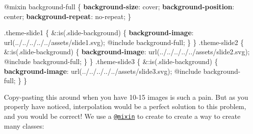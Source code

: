 \documentclass[
  letterpaper,
  DIV=11,
  numbers=noendperiod]{scrreprt}
\newenvironment{Shaded}{\begin{snugshade}}{\end{snugshade}}
\newcommand{\DecValTok}[1]{\textcolor[rgb]{0.68,0.00,0.00}{#1}}
\newcommand{\FunctionTok}[1]{\textcolor[rgb]{0.28,0.35,0.67}{#1}}
\newcommand{\ImportTok}[1]{\textcolor[rgb]{0.00,0.46,0.62}{#1}}
\newcommand{\InformationTok}[1]{\textcolor[rgb]{0.37,0.37,0.37}{#1}}
\newcommand{\KeywordTok}[1]{\textcolor[rgb]{0.00,0.23,0.31}{\textbf{#1}}}
\newcommand{\NormalTok}[1]{\textcolor[rgb]{0.00,0.23,0.31}{#1}}
\newcommand{\OperatorTok}[1]{\textcolor[rgb]{0.37,0.37,0.37}{#1}}
\newcommand{\StringTok}[1]{\textcolor[rgb]{0.13,0.47,0.30}{#1}}
\begin{document}
\begin{Shaded}
\begin{Highlighting}[]
\ImportTok{@mixin} \FunctionTok{background{-}full}\NormalTok{ \{}
  \KeywordTok{background{-}size}\NormalTok{: }\DecValTok{cover}\OperatorTok{;}
  \KeywordTok{background{-}position}\NormalTok{: }\DecValTok{center}\OperatorTok{;}
  \KeywordTok{background{-}repeat}\NormalTok{: }\DecValTok{no{-}repeat}\OperatorTok{;}
\NormalTok{\}}

\FunctionTok{.theme{-}slide1}\NormalTok{ \{}
  \OperatorTok{\&}\InformationTok{:is(.slide{-}background)}\NormalTok{ \{}
    \KeywordTok{background{-}image}\NormalTok{: }\FunctionTok{url(}\StringTok{\textquotesingle{}../../../../../assets/slide1.svg\textquotesingle{}}\FunctionTok{)}\OperatorTok{;}
    \ImportTok{@include}\NormalTok{ background{-}full}\OperatorTok{;}
\NormalTok{  \}}
\NormalTok{\}}
\FunctionTok{.theme{-}slide2}\NormalTok{ \{}
  \OperatorTok{\&}\InformationTok{:is(.slide{-}background)}\NormalTok{ \{}
    \KeywordTok{background{-}image}\NormalTok{: }\FunctionTok{url(}\StringTok{\textquotesingle{}../../../../../assets/slide2.svg\textquotesingle{}}\FunctionTok{)}\OperatorTok{;}
    \ImportTok{@include}\NormalTok{ background{-}full}\OperatorTok{;}
\NormalTok{  \}}
\NormalTok{\}}
\FunctionTok{.theme{-}slide3}\NormalTok{ \{}
  \OperatorTok{\&}\InformationTok{:is(.slide{-}background)}\NormalTok{ \{}
    \KeywordTok{background{-}image}\NormalTok{: }\FunctionTok{url(}\StringTok{\textquotesingle{}../../../../../assets/slide3.svg\textquotesingle{}}\FunctionTok{)}\OperatorTok{;}
    \ImportTok{@include}\NormalTok{ background{-}full}\OperatorTok{;}
\NormalTok{  \}}
\NormalTok{\}}
\end{Highlighting}
\end{Shaded}

Copy-pasting this around when you have 10-15 images is such a pain. But
as you properly have noticed, interpolation would be a perfect solution
to this problem, and you would be correct! We use a
\href{https://sass-lang.com/documentation/at-rules/mixin/}{\texttt{@mixin}}
to create to create a way to create many classes:
\end{document}
